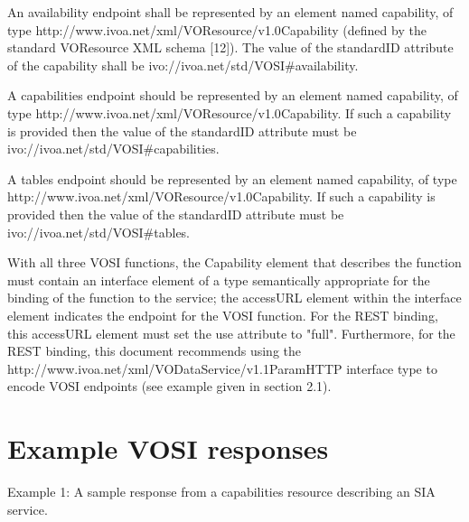 \documentclass[11pt,letter]{ivoa}
\begin{document}
An availability endpoint shall be represented by an element named capability, of type {http://www.ivoa.net/xml/VOResource/v1.0}Capability (defined by the standard VOResource XML schema [12]). The value of the standardID attribute of the capability shall be ivo://ivoa.net/std/VOSI\#availability.

A capabilities endpoint should be represented by an element named capability, of type {http://www.ivoa.net/xml/VOResource/v1.0}Capability. If such a capability is provided then the value of the standardID attribute must be ivo://ivoa.net/std/VOSI\#capabilities.

A tables endpoint should be represented by an element named capability, of type {http://www.ivoa.net/xml/VOResource/v1.0}Capability. If such a capability is provided then the value of the standardID attribute must be ivo://ivoa.net/std/VOSI\#tables.

With all three VOSI functions, the Capability element that describes the function must contain an interface element of a type semantically appropriate for the binding of the function to the service; the accessURL element within the interface element indicates the endpoint for the VOSI function. For the REST binding, this accessURL element must set the use attribute to "full". Furthermore, for the REST binding, this document recommends using the {http://www.ivoa.net/xml/VODataService/v1.1}ParamHTTP interface type to encode VOSI endpoints (see example given in section 2.1). 

\section{Example VOSI responses}

Example 1:
A sample response from a capabilities resource describing an SIA service. 
\end{document}
